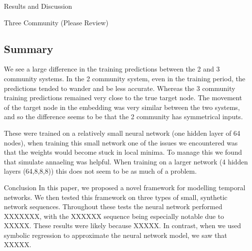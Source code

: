 \documentclass[12pt]{amsart}
\begin{document}
\begin{section}{Results and Discussion}
\begin{subsection}{Three Community (Please Review)}
        \subsection{Summary}
        We see a large difference in the training predictions between the 2 and 3 community systems. In the 2 community system, even in the training period, the predictions tended to wander and be less accurate. Whereas the 3 community training predictions remained very close to the true target node. The movement of the target node in the embedding was very similar between the two systems, and so the difference seems to be that the 2 community has symmetrical inputs.

        These were trained on a relatively small neural network (one hidden layer of 64 nodes), when training this small network one of the issues we encountered was that the weights would become stuck in local minima. To manage this we found that simulate annaeling was helpful. When training on a larger network (4 hidden layers (64,8,8,8)) this does not seem to be as much of a problem.
    \end{subsection}

\end{section}

\begin{section}{Conclusion}
    In this paper, we proposed a novel framework for modelling temporal networks. We then tested this framework on three types of small, synthetic network sequences. Throughout these tests the neural network performed XXXXXXX, with the XXXXXX sequence being especially notable due to XXXXX. These results were likely because XXXXX. In contrast, when we used symbolic regression to approximate the neural network model, we saw that XXXXX.
\end{section} 



\printbibliography
\end{document}
